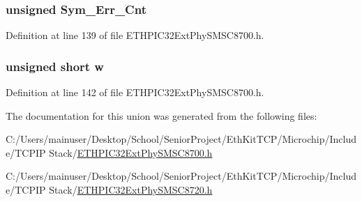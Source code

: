 \subsubsection[{Sym\+\_\+\+Err\+\_\+\+Cnt}]{\setlength{\rightskip}{0pt plus 5cm}unsigned Sym\+\_\+\+Err\+\_\+\+Cnt}\label{union_____s_y_m_b_o_l_e_r_r_c_n_tbits__t_ace632af6668e7ddb8dfcefca6dcac346}


Definition at line 139 of file E\+T\+H\+P\+I\+C32\+Ext\+Phy\+S\+M\+S\+C8700.\+h.

\hypertarget{union_____s_y_m_b_o_l_e_r_r_c_n_tbits__t_a160850a4684a3e82c2323033964f2e98}{}
\subsubsection[{w}]{\setlength{\rightskip}{0pt plus 5cm}unsigned short w}\label{union_____s_y_m_b_o_l_e_r_r_c_n_tbits__t_a160850a4684a3e82c2323033964f2e98}


Definition at line 142 of file E\+T\+H\+P\+I\+C32\+Ext\+Phy\+S\+M\+S\+C8700.\+h.



The documentation for this union was generated from the following files\+:\begin{DoxyCompactItemize}
\item 
C\+:/\+Users/mainuser/\+Desktop/\+School/\+Senior\+Project/\+Eth\+Kit\+T\+C\+P/\+Microchip/\+Include/\+T\+C\+P\+I\+P Stack/\hyperlink{_e_t_h_p_i_c32_ext_phy_s_m_s_c8700_8h}{E\+T\+H\+P\+I\+C32\+Ext\+Phy\+S\+M\+S\+C8700.\+h}\item 
C\+:/\+Users/mainuser/\+Desktop/\+School/\+Senior\+Project/\+Eth\+Kit\+T\+C\+P/\+Microchip/\+Include/\+T\+C\+P\+I\+P Stack/\hyperlink{_e_t_h_p_i_c32_ext_phy_s_m_s_c8720_8h}{E\+T\+H\+P\+I\+C32\+Ext\+Phy\+S\+M\+S\+C8720.\+h}\end{DoxyCompactItemize}
